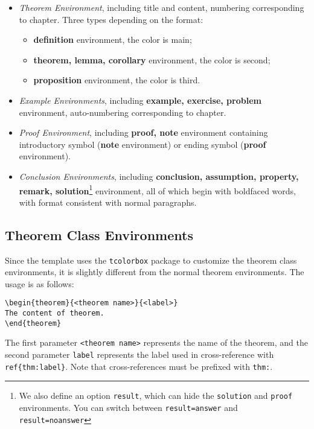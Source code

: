\documentclass[fancy,blue,11pt]{elegantbook}
\begin{document}
\begin{itemize}
\item \textit{Theorem Environment}, including title and content, numbering corresponding to chapter. Three types depending on the format:
   \begin{itemize}
      \item \textcolor{main}{\textbf{definition}} environment, the color is  \textcolor{main}{main};
      \item \textcolor{second}{\textbf{theorem, lemma, corollary}} environment, the color is \textcolor{second} {second};
      \item \textcolor{third}{\textbf{proposition}} environment, the color is \textcolor{third}{third}.
   \end{itemize}
\item \textit{Example Environments}, including \textbf{example, exercise, problem} environment, auto-numbering corresponding to chapter.
\item \textit{Proof Environment}, including \textbf{proof, note} environment containing introductory symbol (\textbf{note} environment) or ending symbol (\textbf{proof} environment).
\item \textit{Conclusion Environments}, including \textbf{conclusion, assumption, property, remark, solution}\footnote{We also define an option \lstinline{result}, which can hide the \lstinline{solution} and \lstinline{proof} environments. You can switch between \lstinline{result=answer} and \lstinline{result=noanswer}} environment, all of which begin with boldfaced words, with format consistent with normal paragraphs.
\end{itemize}

\subsection{Theorem Class Environments}
Since the template uses the \lstinline{tcolorbox} package to customize the theorem class environments, it is slightly different from the normal theorem environments. The usage is as follows:
\begin{lstlisting}
\begin{theorem}{<theorem name>}{<label>}
The content of theorem.
\end{theorem}
\end{lstlisting}

The first parameter \lstinline{<theorem name>} represents the name of the theorem, and the second parameter \lstinline{label} represents the label used in cross-reference with \verb|ref{thm:label}|. Note that cross-references must be prefixed with \lstinline{thm:}. 
\end{document}
